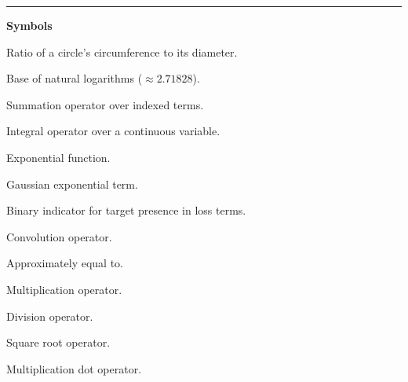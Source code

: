 \documentclass[12pt,a4paper,oneside]{report}
\begin{document}
\newpage
\thispagestyle{empty}
\vspace*{-1.5cm}
\hfill\textcolor{gray}{\textit{}}
\vspace{0.2cm}
\noindent\rule{\textwidth}{0.5pt}
\vspace{0.5cm}
{\fontsize{12pt}{18pt}\selectfont
{\fontsize{14pt}{21pt}\selectfont\textbf{Symbols}}

\vspace{0.5cm}

{\setlength{\parindent}{0pt}%
\begin{description}[leftmargin=1.8cm, style=nextline, itemsep=4pt]
    \item[$\pi$] Ratio of a circle's circumference to its diameter.
    \item[$e$] Base of natural logarithms ($\approx 2.71828$).
    \item[$\sum$] Summation operator over indexed terms.
    \item[$\int$] Integral operator over a continuous variable.
    \item[$\exp(\cdot)$] Exponential function.
    \item[$\exp\left(-\frac{(t_i - t_0)^2}{2\sigma^2}\right)$] Gaussian exponential term.
    \item[$\alpha_{ji}^{\text{trg}}$] Binary indicator for target presence in loss terms.
    \item[$*$] Convolution operator.
    \item[$\approx$] Approximately equal to.
    \item[$\times$] Multiplication operator.
    \item[$/$] Division operator.
    \item[$\sqrt{\cdot}$] Square root operator.
    \item[$\cdot$] Multiplication dot operator.
\end{description}%
}
}
\vspace*{\fill}
\newpage
\end{document}
